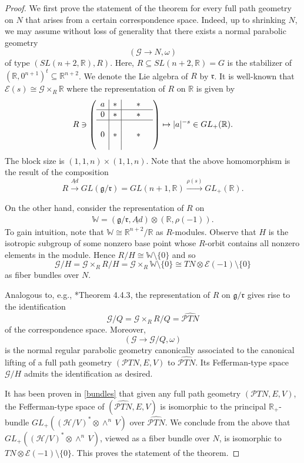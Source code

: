 \documentclass[11pt]{amsart}
\begin{document}
\begin{proof}
We first prove the statement of the theorem for every full path geometry on $N$ that arises from a certain correspondence space. Indeed, up to shrinking $N$, we may assume without loss of generality that there exists a normal parabolic geometry
\[(\mathcal G\to N,\omega)\]
of type $(SL(n+2,\mathbb R),R)$. Here, $R\subseteq SL(n+2,\mathbb R)=G$ is the stabilizer of $(\mathbb R, 0^{n+1})^t\subseteq\mathbb R^{n+2}$. We denote the Lie algebra of $R$ by $\mathfrak r$. It is well-known that $\mathcal E(s)\cong\mathcal G\times_R\mathbb R$ where the representation of $R$ on $\mathbb R$ is given by
\begin{align*}
    R\ni \left(\begin{array}{c|c|ccc}
 	a&*& &*&\\
 	\hline 0&*& &*&\\
 	\hline  & & & &\\
 	0&*&\ &*&\\
 	&&&&
 \end{array}\right)\mapsto |a|^{-s}\in GL_+(\mathbb R).
\end{align*}
The block size is $(1,1,n)\times(1,1,n)$. Note that the above homomorphism is the result of the composition
\[R\xrightarrow{\underline{Ad}} GL(\mathfrak g/\mathfrak r)=GL(n+1,\mathbb R)\xrightarrow{\rho(s)}GL_+(\mathbb R).\]

On the other hand, consider the representation of $R$ on
\begin{align*}
    \mathbb W=(\mathfrak g/\mathfrak r,\underline{Ad})\otimes(\mathbb R,\rho(-1)).
\end{align*}
To gain intuition, note that $\mathbb W\cong\mathbb R^{n+2}/\mathbb R$ as $R$-modules. Observe that $H$
is the isotropic subgroup of some nonzero base point whose $R$-orbit contains all nonzero elements in the module. Hence $R/H\cong\mathbb W\setminus\{0\}$
and so
\[\mathcal G/H=\mathcal G\times_RR/H=\mathcal G\times_R\mathbb W\setminus\{0\}\cong TN\otimes\mathcal E(-1)\setminus\{0\}\]
as fiber bundles over $N$.

Analogous to, e.g., \cite{Book}*{Theorem 4.4.3}, the representation of $R$ on $\mathfrak g/\mathfrak r$ gives rise to the identification
\[\mathcal G/Q=\mathcal G\times_RR/Q=\widehat{\mathcal PTN}\]
of the correspondence space. Moreover,
\[(\mathcal G\to\mathcal G/Q,\omega)\]
is the normal regular parabolic geometry canonically associated to the canonical lifting of a full path geometry $(\mathcal PTN,E,V)$ to $\widehat{\mathcal PTN}$. Its Fefferman-type space $\mathcal G/H$ admits the identification as desired.

It has been proven in \cref{bundles} that given any full path geometry $(\mathcal PTN,E,V)$, the Fefferman-type space of $(\widehat{\mathcal PTN},E,V)$ is isomorphic to the principal $\mathbb R_+$-bundle $GL_+((\mathcal H/V)^*\otimes\wedge^n\,V)$ over $\widehat{\mathcal PTN}$. We conclude from the above that $GL_+((\mathcal H/V)^*\otimes\wedge^n\,V)$, viewed as a fiber bundle over $N$, is isomorphic to  $TN\otimes\mathcal E(-1)\setminus\{0\}$. This proves the statement of the theorem.
\end{proof}
\end{document}
